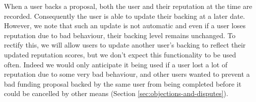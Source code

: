 When a user backs a proposal, both the user and their reputation at the time are recorded. Consequently the user is able to update their backing at a later date. However, we note that such an update is not automatic and even if a user loses reputation due to bad behaviour, their backing level remains unchanged. To rectify this, we will allow users to update another user's backing to reflect their updated reputation scores, but we don't expect this functionality to be used often. Indeed we would only anticipate it being used if a user lost a lot of reputation due to some very bad behaviour, and other users wanted to prevent a bad funding proposal backed by the same user from being completed before it could be cancelled by other means (Section \ref{sec:objections-and-disputes}). %





